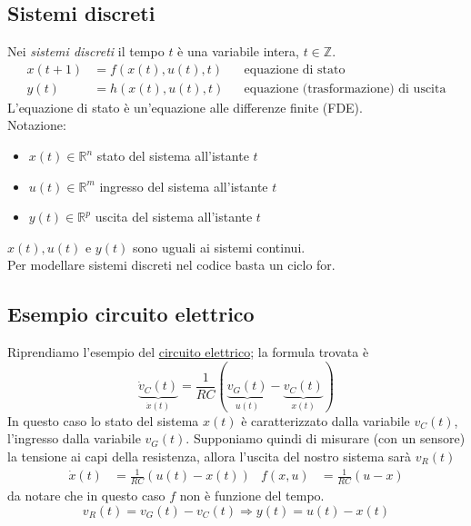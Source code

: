 \documentclass{article}
\numberwithin{equation}{subsection}
\let\oldsubsection\subsection%
\renewcommand{\subsection}{%
  \renewcommand{\theequation}{\thesubsection.\arabic{equation}}%
  \oldsubsection}%
\begin{document}
\subsection{Sistemi discreti}
Nei \textit{sistemi discreti} il tempo $t$ è una variabile intera, $t \in \mathbb{Z}$.
\begin{align*}
    x(t+1) &= f \left(x(t), u(t), t\right) & &\text{equazione di stato}\\
    y(t) &= h\left(x(t), u(t), t\right) & &\text{equazione (trasformazione) di uscita}
\end{align*}
L'equazione di stato è un'equazione alle differenze finite (FDE).
\vspace*{0.2cm}\\
Notazione:
\begin{itemize}
    \item $x(t) \in \mathbb{R}^n$ stato  del sistema all'istante $t$
    \item $u(t) \in \mathbb{R}^m$ ingresso del sistema all'istante $t$
    \item $y(t) \in \mathbb{R}^p$ uscita del sistema all'istante $t$
\end{itemize}
$x(t),u(t) \text{ e } y(t)$ sono uguali ai sistemi continui.\\
Per modellare sistemi discreti nel codice basta un ciclo {\selectfont for}.



\subsection{Esempio circuito elettrico}
Riprendiamo l'esempio del \hyperlink{Circuito elettrico}{circuito elettrico}; la formula trovata è 
\begin{equation}
    \underbrace{\dot v_C(t)}_{\dot x(t)} = \frac{1}{RC} (\underbrace{v_G (t)}_{u(t)} - \underbrace{v_C (t)}_{x(t)} )
\end{equation}
In questo caso lo stato del sistema $x(t)$ è caratterizzato dalla variabile $v_C(t)$, l'ingresso dalla variabile $v_G(t)$. Supponiamo quindi di misurare (con un sensore) la tensione ai capi della resistenza, allora l'uscita del nostro sistema sarà $v_R(t)$
\begin{align*}
    \dot x(t) &= \frac{1}{RC} \left(u(t)-x(t)\right) &
    f(x,u) &= \frac{1}{RC}(u-x)
\end{align*}
da notare che in questo caso $f$ non è funzione del tempo.
\begin{equation}
    v_R(t) = v_G(t) - v_C(t) \Longrightarrow y(t) = u(t) - x(t)
\end{equation}
\end{document}

